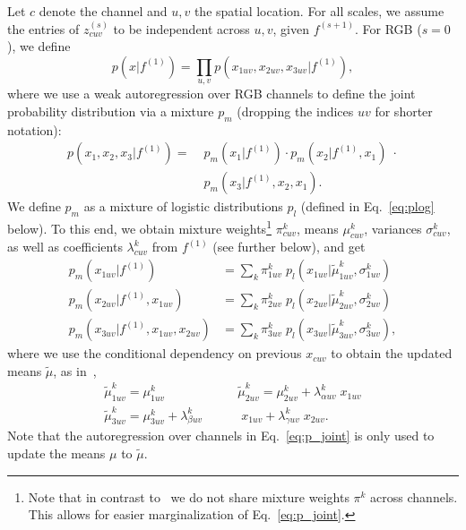 \documentclass[10pt,twocolumn,letterpaper]{article}
\newcommand{\pmix}{p_m}
\newcommand{\plogistic}{p_l}
\begin{document}
Let $c$ denote the channel and $u,v$ the spatial location. For all scales, we assume the entries of $z^{(s)}_{cuv}$ to be independent across $u,v$, given $f^{(s+1)}$. 
For RGB ($s=0$), we define
\begin{equation}
    p(x|f^{(1)}) = \prod_{u,v} p(x_{1uv},x_{2uv},x_{3uv}|f^{(1)}), \label{p_x_factorization}
\end{equation}
    where we use a weak autoregression over RGB channels to define the joint probability distribution via a mixture $\pmix$ (dropping the indices $uv$ for shorter notation):
\begin{align}
    p(x_1, x_2, x_3 | f^{(1)}) =\;&\pmix(x_1 | f^{(1)}) \cdot \pmix(x_2 | f^{(1)}, x_1) \; \cdot \nonumber \\
                                 &\pmix(x_3 | f^{(1)}, x_2, x_1) .
    \label{eq:p_joint}
\end{align}
    We define $\pmix$ as a mixture of logistic distributions $\plogistic$ (defined in Eq.~\eqref{eq:plog} below). To this end, we obtain mixture weights\footnote{Note that in contrast to~\cite{Salimans2017pcnnpp} we do not share mixture weights $\pi^k$ across channels. This allows for easier marginalization of Eq.~\eqref{eq:p_joint}.}
    $\pi^k_{cuv}$, means $\mu^k_{cuv}$, variances $\sigma^k_{cuv}$, as well as coefficients $\lambda^k_{cuv}$ from $f^{(1)}$ (see further below), and get
\begin{align}
    \pmix(x_{1uv} | f^{(1)}) &= \sum_k \pi^k_{1uv} \; \plogistic(x_{1uv} | \tilde \mu^k_{1uv}, \sigma^k_{1uv}) \nonumber \\
    \pmix(x_{2uv} | f^{(1)}, x_{1uv}) &= \sum_k \pi^k_{2uv} \; \plogistic(x_{2uv} | \tilde \mu^k_{2uv}, \sigma^k_{2uv}) \nonumber \\
    \pmix(x_{3uv} | f^{(1)}, x_{1uv}, x_{2uv}) &= \sum_k \pi^k_{3uv} \; \plogistic(x_{3uv} | \tilde \mu^k_{3uv}, \sigma^k_{3uv}), \label{eq:p_mix}
\end{align}
    where we use the conditional dependency on previous $x_{cuv}$ to obtain the updated means $\tilde \mu$, as in~\cite[Sec. 2.2]{Salimans2017pcnnpp},
\begin{align}
    \tilde \mu^k_{1uv} = \mu^k_{1uv} \nonumber \hspace{5em}
    &\tilde \mu^k_{2uv} = \mu^k_{2uv} + \lambda^k_{\alpha uv} \; x_{1uv} \nonumber  \\
    \tilde \mu^k_{3uv} = \mu^k_{3uv} + \lambda^k_{\beta uv} &\; x_{1uv} + \lambda^k_{\gamma uv} \; x_{2uv}.
    \label{eq:updating_mus}
\end{align}
Note that the autoregression over channels in Eq.~\eqref{eq:p_joint} is only used to update the means $\mu$ to $\tilde \mu$.
\end{document}
